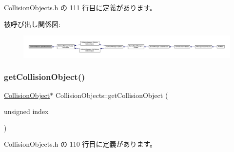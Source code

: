  Collision\+Objects.\+h の 111 行目に定義があります。

被呼び出し関係図\+:
\nopagebreak
\begin{figure}[H]
\begin{center}
\leavevmode
\includegraphics[width=350pt]{class_collision_objects_af95769194fff92babcf411c2262c9d10_icgraph}
\end{center}
\end{figure}
\mbox{\label{class_collision_objects_a4f5c029b20a7ed4c7fdee815f73d20be}} 
\subsubsection{\texorpdfstring{get\+Collision\+Object()}{getCollisionObject()}}
{\footnotesize\ttfamily \mbox{\hyperlink{class_collision_object}{Collision\+Object}}$\ast$ Collision\+Objects\+::get\+Collision\+Object (\begin{DoxyParamCaption}\item[{unsigned}]{index }\end{DoxyParamCaption})\hspace{0.3cm}{\ttfamily [inline]}}



 Collision\+Objects.\+h の 110 行目に定義があります。

